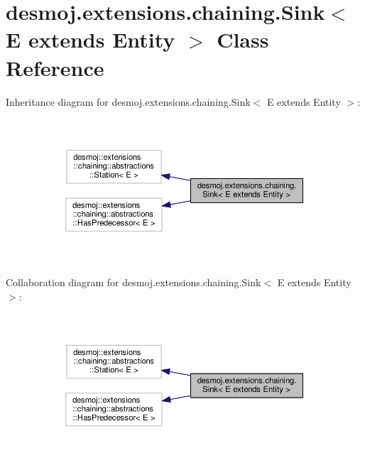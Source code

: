 \section{desmoj.\-extensions.\-chaining.\-Sink$<$ E extends Entity $>$ Class Reference}
\label{classdesmoj_1_1extensions_1_1chaining_1_1_sink_3_01_e_01extends_01_entity_01_4}


Inheritance diagram for desmoj.\-extensions.\-chaining.\-Sink$<$ E extends Entity $>$\-:
\nopagebreak
\begin{figure}[H]
\begin{center}
\leavevmode
\includegraphics[width=350pt]{classdesmoj_1_1extensions_1_1chaining_1_1_sink_3_01_e_01extends_01_entity_01_4__inherit__graph}
\end{center}
\end{figure}


Collaboration diagram for desmoj.\-extensions.\-chaining.\-Sink$<$ E extends Entity $>$\-:
\nopagebreak
\begin{figure}[H]
\begin{center}
\leavevmode
\includegraphics[width=350pt]{classdesmoj_1_1extensions_1_1chaining_1_1_sink_3_01_e_01extends_01_entity_01_4__coll__graph}
\end{center}
\end{figure}
